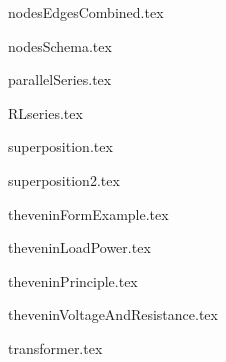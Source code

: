 \begin{frame}{nodesEdgesCombined.tex}
\begin{center}

\end{center}
\end{frame}

\begin{frame}{nodesSchema.tex}
\begin{center}

\end{center}
\end{frame}

\begin{frame}{parallelSeries.tex}
\begin{center}

\end{center}
\end{frame}

\begin{frame}{RLseries.tex}
\begin{center}

\end{center}
\end{frame}

\begin{frame}{superposition.tex}
\begin{center}

\end{center}
\end{frame}

\begin{frame}{superposition2.tex}
\begin{center}

\end{center}
\end{frame}

\begin{frame}{theveninFormExample.tex}
\begin{center}

\end{center}
\end{frame}

\begin{frame}{theveninLoadPower.tex}
\begin{center}

\end{center}
\end{frame}

\begin{frame}{theveninPrinciple.tex}
\begin{center}

\end{center}
\end{frame}

\begin{frame}{theveninVoltageAndResistance.tex}
\begin{center}

\end{center}
\end{frame}

\begin{frame}{transformer.tex}
\begin{center}

\end{center}
\end{frame}

